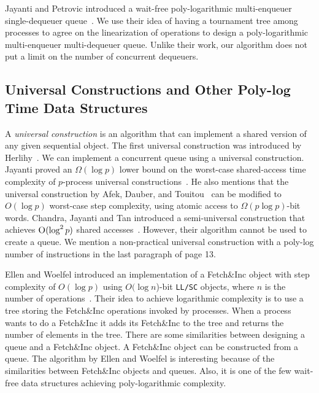 \documentclass[acmsmall,nonacm,anonymous]{acmart}
\newcommand{\nf}[1]{{\normalfont{\texttt{#1}}}}
\begin{document}
Jayanti and Petrovic introduced a wait-free poly-logarithmic multi-enqueuer single-dequeuer queue~\cite{DBLP:conf/fsttcs/JayantiP05}. We use their idea of having a tournament tree among processes to agree on the linearization of operations to design a poly-logarithmic multi-enqueuer multi-dequeuer queue. Unlike their work, our algorithm does not put a limit on the number of concurrent dequeuers. 

\subsection{Universal Constructions and Other Poly-log Time Data Structures}
A \textit{universal construction} is an algorithm that can implement a shared version of any given sequential object. The first universal construction was introduced by Herlihy~\cite{10.1145/114005.102808}. We can implement a concurrent queue using a universal construction. Jayanti proved an $\Omega(\log p)$ lower bound on the worst-case shared-access time complexity of $p$-process universal constructions~\cite{DBLP:conf/podc/Jayanti98a}. He also mentions that the universal construction by Afek, Dauber, and Touitou~\cite{DBLP:conf/stoc/AfekDT95} can be modified to $O(\log p)$ worst-case step complexity, using atomic access to $\Omega(p \log p)$-bit words. Chandra, Jayanti and Tan introduced a semi-universal construction that achieves $\textsc{O}(\log^2 p)$ shared accesses~\cite{DBLP:conf/podc/ChandraJT98}. However, their algorithm cannot be used to create a queue. We mention a non-practical universal construction with a poly-log number of \nf{CAS} instructions in the last paragraph of page 13.

Ellen and Woelfel introduced an implementation of a Fetch\&Inc object with step complexity of $O(\log p)$ using $O(\log n$)-bit \texttt{LL/SC} objects, where $n$ is the number of operations~\cite{10.1007/978-3-642-41527-2_20}. Their idea to achieve logarithmic complexity is to use a tree storing the Fetch\&Inc operations invoked by processes. When a process wants to do a Fetch\&Inc it adds its Fetch\&Inc to the tree and returns the number of elements in the tree. There are some similarities between designing a queue and a Fetch\&Inc object. A Fetch\&Inc object can be constructed from a queue. The algorithm by Ellen and Woelfel is interesting because of the similarities between Fetch\&Inc objects and queues. Also, it is one of the few wait-free data structures achieving poly-logarithmic complexity.
\end{document}
